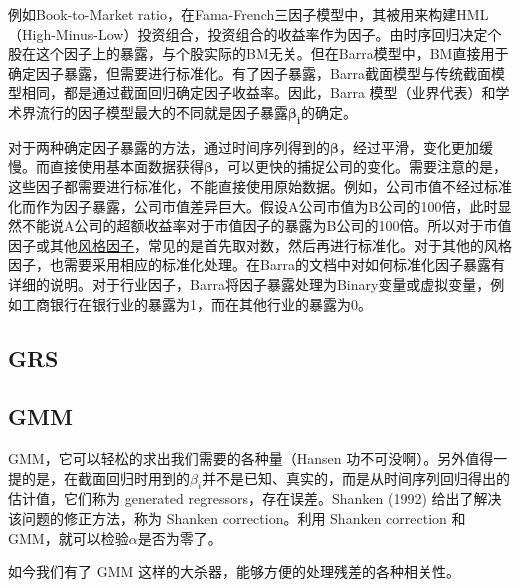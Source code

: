 \documentclass[11pt]{article}
\begin{document}
例如Book-to-Market ratio，在Fama-French三因子模型中，其被用来构建HML（High-Minus-Low）投资组合，投资组合的收益率作为因子。由时序回归决定个股在这个因子上的暴露，与个股实际的BM无关。但在Barra模型中，BM直接用于确定因子暴露，但需要进行标准化。有了因子暴露，Barra截面模型与传统截面模型相同，都是通过截面回归确定因子收益率。因此，Barra 模型（业界代表）和学术界流行的因子模型最大的不同就是因子暴露$\bm{\beta_i}$的确定。

对于两种确定因子暴露的方法，通过时间序列得到的$\bm{\beta}$，经过平滑，变化更加缓慢。而直接使用基本面数据获得$\bm{\beta}$，可以更快的捕捉公司的变化。需要注意的是，这些因子都需要进行标准化，不能直接使用原始数据。例如，公司市值不经过标准化而作为因子暴露，公司市值差异巨大。假设A公司市值为B公司的100倍，此时显然不能说A公司的超额收益率对于市值因子的暴露为B公司的100倍。所以对于市值因子或其他\uline{风格因子}，常见的是首先取对数，然后再进行标准化。对于其他的风格因子，也需要采用相应的标准化处理。在Barra的文档中对如何标准化因子暴露有详细的说明。对于行业因子，Barra将因子暴露处理为Binary变量或虚拟变量，例如工商银行在银行业的暴露为1，而在其他行业的暴露为0。

\subsection{GRS}

\subsection{GMM}

GMM，它可以轻松的求出我们需要的各种量（Hansen 功不可没啊）。另外值得一提的是，在截面回归时用到的$\beta_i$并不是已知、真实的，而是从时间序列回归得出的估计值，它们称为 generated regressors，存在误差。Shanken (1992) 给出了解决该问题的修正方法，称为 Shanken correction。利用 Shanken correction 和 GMM，就可以检验$\alpha$是否为零了。

如今我们有了 GMM 这样的大杀器，能够方便的处理残差的各种相关性。

\appendix
\end{document}
